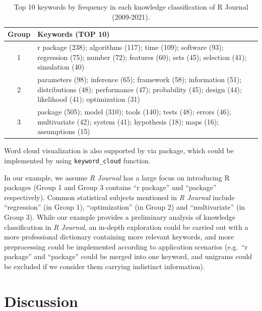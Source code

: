 \begin{table}

\caption{\label{tab:tab2-2}Top 10 keywords by frequency in each knowledge classification of R Journal (2009-2021).}
\centering
\fontsize{7}{9}\selectfont
\begin{tabular}[t]{c|>{\centering\arraybackslash}p{10cm}}
\hline
Group & Keywords (TOP 10)\\
\hline
1 & r package (238); algorithms (117); time (109); software (93); regression (75); number (72); features (60); sets (45); selection (41); simulation (40)\\
\hline
2 & parameters (98); inference (65); framework (58); information (51); distributions (48); performance (47); probability (45); design (44); likelihood (41); optimization (31)\\
\hline
3 & package (505); model (310); tools (140); tests (48); errors (46); multivariate (42); system (41); hypothesis (18); maps (16); assumptions (15)\\
\hline
\end{tabular}
\end{table}

Word cloud visualization is also supported by  via  package, which could be implemented by using \texttt{keyword\_cloud} function.

In our example, we assume \emph{R Journal} has a large focus on introducing R packages (Group 1 and Group 3 contains ``r package'' and ``package'' respectively). Common statistical subjects mentioned in \emph{R Journal} include ``regression'' (in Group 1), ``optimization'' (in Group 2) and ``multivariate'' (in Group 3). While our example provides a preliminary analysis of knowledge classification in \emph{R Journal}, an in-depth exploration could be carried out with a more professional dictionary containing more relevant keywords, and more preprocessing could be implemented according to application scenarios (e.g.~``r package'' and ``package'' could be merged into one keyword, and unigrams could be excluded if we consider them carrying indistinct information).

\hypertarget{discussion}{%
\section{Discussion}\label{discussion}}

